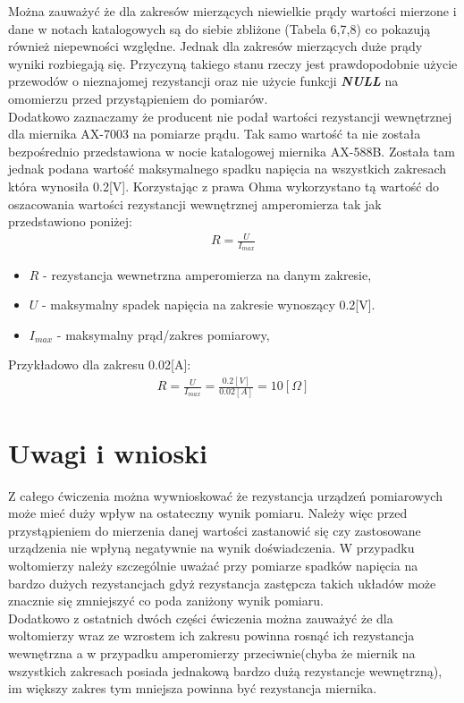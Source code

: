 \documentclass[11pt]{article}
\begin{document}
    \indent Można zauważyć że dla zakresów mierzących niewielkie prądy wartości mierzone i dane w notach katalogowych
    są do siebie zbliżone (Tabela 6,7,8) co pokazują również niepewności względne. Jednak dla zakresów mierzących duże prądy wyniki rozbiegają się.
    Przyczyną takiego stanu rzeczy jest prawdopodobnie użycie przewodów o nieznajomej
    rezystancji oraz nie użycie funkcji \textbf{\textit{NULL}} na omomierzu przed przystąpieniem do pomiarów.\\
    \indent Dodatkowo zaznaczamy że producent nie podał wartości rezystancji
    wewnętrznej dla miernika AX-7003 na pomiarze prądu. Tak
    samo wartość ta nie została bezpośrednio przedstawiona w
    nocie katalogowej miernika AX-588B. Została tam jednak podana
    wartość maksymalnego spadku napięcia na wszystkich zakresach która wynosiła 0.2[V].
    Korzystając z prawa Ohma wykorzystano tą wartość do oszacowania wartości rezystancji wewnętrznej amperomierza tak jak przedstawiono poniżej:
    \begin{gather*}
        R=\frac{U}{I_{max}}
    \end{gather*}
    {\footnotesize
        \begin{itemize}
            \setlength\itemsep{0em}
            \item[] \boldmath$R$ - rezystancja wewnetrzna amperomierza na danym zakresie,
            \item[] \boldmath$U$ - maksymalny spadek napięcia na zakresie wynoszący 0.2[V].
            \item[] \boldmath$I_{max}$ - maksymalny prąd/zakres pomiarowy,
        \end{itemize}}
    \noindent Przykładowo dla zakresu 0.02[A]:
    \begin{gather*}
        R=\frac{U}{I_{max}}=\frac{0.2[V]}{0.02[A]}=10[\Omega]
    \end{gather*}

    \section{Uwagi i wnioski}
    Z całego ćwiczenia można wywnioskować że rezystancja urządzeń
    pomiarowych może mieć duży wpływ na ostateczny wynik pomiaru.
    Należy więc przed przystąpieniem do mierzenia danej wartości
    zastanowić się czy zastosowane urządzenia nie wpłyną negatywnie na wynik doświadczenia.
    W przypadku woltomierzy należy szczególnie uważać przy pomiarze
    spadków napięcia na bardzo dużych rezystancjach gdyż rezystancja zastępcza
    takich układów może znacznie się zmniejszyć co poda zaniżony wynik pomiaru.\\
    \indent Dodatkowo z ostatnich dwóch części ćwiczenia można zauważyć że dla woltomierzy wraz ze
    wzrostem ich zakresu powinna rosnąć ich rezystancja wewnętrzna a w przypadku amperomierzy przeciwnie(chyba że miernik na wszystkich zakresach posiada jednakową bardzo dużą rezystancje wewnętrzną),
    im większy zakres tym mniejsza powinna być rezystancja miernika.
\end{document}
